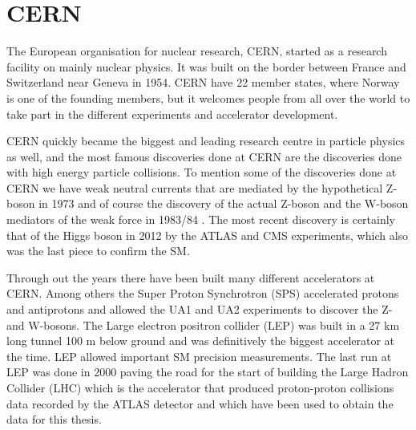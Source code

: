 \section{CERN}
\label{sec:cern}

The European organisation for nuclear research, CERN, started as a research facility on mainly nuclear physics. It was built on the border between France and Switzerland near Geneva in 1954. CERN have 22 member states, where Norway is one of the founding members, but it welcomes people from all over the world to take part in the different experiments and accelerator development. 

CERN quickly became the biggest and leading research centre in particle physics as well, and the most famous discoveries done at CERN are the discoveries done with high energy particle collisions. To mention some of the discoveries done at CERN we have weak neutral currents that are mediated by the hypothetical Z-boson in 1973 \cite{Zmed} and of course the discovery of the actual Z-boson and the W-boson mediators of the weak force in 1983/84 \cite{WZ1, WZ2, WZ3}. The most recent discovery is certainly that of the Higgs boson \cite{Higgs_ATLAS, Higgs_CMS} in 2012 by the ATLAS and CMS experiments, which also was the last piece to confirm the SM.

Through out the years there have been built many different accelerators at CERN. Among others the Super Proton Synchrotron (SPS) accelerated protons and antiprotons and allowed the UA1 and UA2 experiments to discover the Z- and W-bosons. The Large electron positron collider (LEP) was built in a 27 km long tunnel 100 m below ground and was definitively the biggest accelerator at the time. LEP allowed important SM precision measurements. The last run at LEP was done in 2000 paving the road for the start of building the Large Hadron Collider (LHC) which is the accelerator that produced proton-proton collisions data recorded by the ATLAS detector and which have been used to obtain the data for this thesis. 